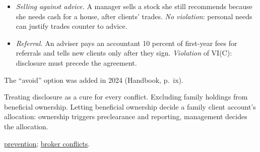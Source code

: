 \begin{qfrule}
\begin{itemize}
\item \emph{Selling against advice.} A manager sells a stock she still recommends because she needs cash for a house, after clients' trades. \emph{No violation}: personal needs can justify trades counter to advice.
\item \emph{Referral.} An adviser pays an accountant 10 percent of first-year fees for referrals and tells new clients only after they sign. \emph{Violation} of VI(C): disclosure must precede the agreement.
\end{itemize}

 The ``avoid'' option was added in 2024 (Handbook, p.~ix).

 Treating disclosure as a cure for every conflict. Excluding family holdings from beneficial ownership. Letting beneficial ownership decide a family client account's allocation: ownership triggers preclearance and reporting, management decides the allocation.

 \hyperref[meth:preventing-conflict-violations]{prevention}; \hyperref[def:broker-agency-conflicts]{broker conflicts}.

\end{qfrule}

